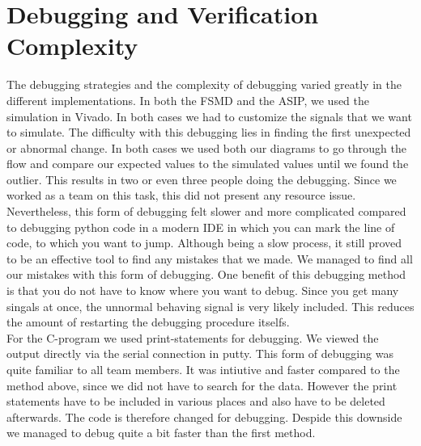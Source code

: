 \documentclass[conference]{IEEEtran}
\begin{document}
\section{Debugging and Verification Complexity}\label{sec:debugging}
The debugging strategies and the complexity of debugging varied greatly in the different implementations. In both the FSMD and the ASIP, we used the simulation in Vivado. In both cases we had to customize the signals that we want to simulate. The difficulty with this debugging lies in finding the first unexpected or abnormal change. In both cases we used both our diagrams to go through the flow and compare our expected values to the simulated values until we found the outlier. This results in two or even three people doing the debugging. Since we worked as a team on this task, this did not present any resource issue. Nevertheless, this form of debugging felt slower and more complicated compared to debugging python code in a modern IDE in which you can mark the line of code, to which you want to jump. Although being a slow process, it still proved to be an effective tool to find any mistakes that we made. We managed to find all our mistakes with this form of debugging. One benefit of this debugging method is that you do not have to know where you want to debug. Since you get many singals at once, the unnormal behaving signal is very likely included. This reduces the amount of restarting the debugging procedure itselfs. \\
For the C-program we used print-statements for debugging. We viewed the output directly via the serial connection in putty. This form of debugging was quite familiar to all team members. It was intiutive and faster compared to the method above, since we did not have to search for the data. However the print statements have to be included in various places and also have to be deleted afterwards. The code is therefore changed for debugging. Despide this downside we managed to debug quite a bit faster than the first method. \\
\end{document}
